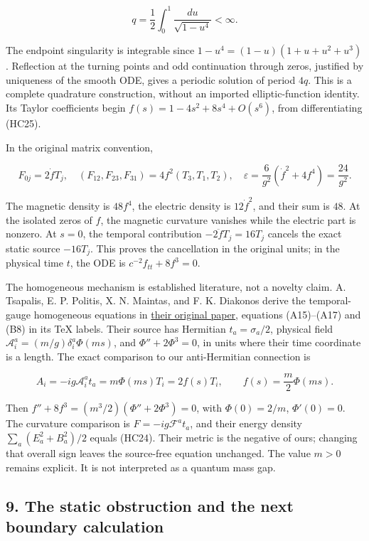 \documentclass[11pt]{article}
\begin{document}
\[
 q=\frac12\int_0^1\frac{du}{\sqrt{1-u^4}}<\infty.
 \tag{HC26}
\]

The endpoint singularity is integrable since
\(1-u^4=(1-u)(1+u+u^2+u^3)\). Reflection at the turning points and
odd continuation through zeros, justified by uniqueness of the smooth
ODE, gives a periodic solution of period \(4q\). This is a complete
quadrature construction, without an imported elliptic-function identity.
Its Taylor coefficients begin
\(f(s)=1-4s^2+8s^4+O(s^6)\), from differentiating (HC25).

In the original matrix convention,

\[
 F_{0j}=2\dot f T_j,\quad
 (F_{12},F_{23},F_{31})=4f^2(T_3,T_1,T_2),\quad
 \varepsilon=\frac6{g^2}(\dot f^2+4f^4)=\frac{24}{g^2}.
 \tag{HC27}
\]

The magnetic density is \(48f^4\), the electric density is \(12\dot f^2\),
and their sum is \(48\). At the isolated zeros of \(f\), the magnetic
curvature vanishes while the electric part is nonzero. At \(s=0\), the
temporal contribution \(-2\ddot f T_j=16T_j\) cancels the exact static
source \(-16T_j\). This proves the cancellation in the original units;
in the physical time \(t\), the ODE is \(c^{-2}f_{tt}+8f^3=0\).

The homogeneous mechanism is established literature, not a novelty claim.
A. Tsapalis, E. P. Politis, X. N. Maintas, and F. K. Diakonos derive the
temporal-gauge homogeneous equations in
\href{https://arxiv.org/abs/1603.01858}{their original paper}, equations
(A15)–(A17) and (B8) in its TeX labels. Their source has Hermitian
\(t_a=\sigma_a/2\), physical field
\(\mathcal A_i^a=(m/g)\delta_i^a\Phi(ms)\), and
\(\Phi''+2\Phi^3=0\), in units where their time coordinate is a length.
The exact comparison to our anti-Hermitian connection is

\[
 A_i=-ig\mathcal A_i^a t_a=m\Phi(ms)T_i=2f(s)T_i,
 \qquad f(s)=\frac m2\Phi(ms).
 \tag{HC28}
\]

Then \(f''+8f^3=(m^3/2)(\Phi''+2\Phi^3)=0\), with
\(\Phi(0)=2/m\), \(\Phi'(0)=0\). The curvature comparison is
\(F=-ig\mathcal F^a t_a\), and their energy density
\(\sum_a(E_a^2+B_a^2)/2\) equals (HC24). Their metric is the negative
of ours; changing that overall sign leaves the source-free equation
unchanged. The value \(m>0\) remains explicit. It is not interpreted
as a quantum mass gap.

\subsection*{9. The static obstruction and the next boundary calculation}
\end{document}
